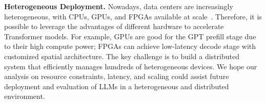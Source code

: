 
\noindent\textbf{Heterogeneous Deployment.} 
Nowadays, data centers are increasingly heterogeneous, with CPUs, GPUs, and FPGAs available at scale~\cite{caulfield2016microsoft,chung2018brainwave,narayanan2021megatronv2}.
Therefore, it is possible to leverage the advantages of different hardware to accelerate Transformer models.
For example, GPUs are good for the GPT prefill stage due to their high compute power; FPGAs can achieve low-latency decode stage with customized spatial architecture.
The key challenge is to build a distributed system that efficiently manages hundreds of heterogeneous devices.
We hope our analysis on resource constraints, latency, and scaling could assist future deployment and evaluation of LLMs in a heterogeneous and distributed environment.

